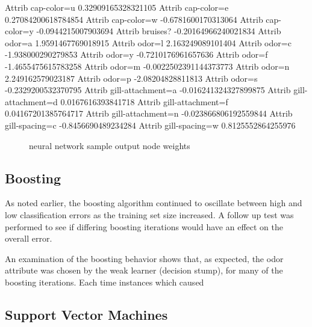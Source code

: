 \documentclass{sig-alternate}
\begin{document}
\begin{verbbox}
Attrib cap-color=u    0.32909165328321105
Attrib cap-color=e    0.27084200618784854
Attrib cap-color=w    -0.6781600170313064
Attrib cap-color=y    -0.0944215007903694
Attrib bruises?    -0.20164966240021834
Attrib odor=a    1.9591467769018915
Attrib odor=l    2.163249089101404
Attrib odor=c    -1.938000290279853
Attrib odor=y    -0.7210176961657636
Attrib odor=f    -1.4655475615783258
Attrib odor=m    -0.0022502391144373773
Attrib odor=n    2.249162579023187
Attrib odor=p    -2.08204828811813
Attrib odor=s    -0.2329200532370795
Attrib gill-attachment=a    -0.016241324327899875
Attrib gill-attachment=d    0.0167616393841718
Attrib gill-attachment=f    0.04167201385764717
Attrib gill-attachment=n    -0.023866806192559844
Attrib gill-spacing=c    -0.8456690489234284
Attrib gill-spacing=w    0.8125552864255976
\end{verbbox}

\begin{figure}[!htbp]
    \centering
    \theverbbox
    \caption{neural network sample output node weights \label{ag-nn-weights}}
\end{figure}


\subsection{Boosting}

As noted earlier, the boosting algorithm continued to oscillate between high and low classification errors as the training set size increased. A follow up test was performed to see if differing boosting iterations would have an effect on the overall error. 

An examination of the boosting behavior shows that, as expected, the odor attribute was chosen by the weak learner (decision stump), for many of the boosting iterations. Each time instances which caused 

\subsection{Support Vector Machines}
\end{document}
